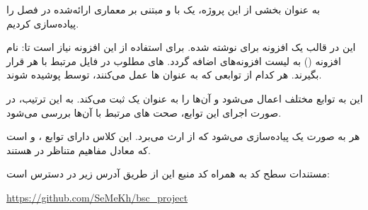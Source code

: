 به عنوان بخشی از این پروژه، یک   با  و مبتنی بر معماری ارائه‌شده در فصل  را پیاده‌سازی کردیم.


این  در قالب یک افزونه برای  نوشته شده. برای استفاده از این افزونه نیاز است تا:
 نام افزونه () به لیست افزونه‌های  اضافه گردد.
 ‌های مطلوب در فایل  مرتبط با هر   قرار بگیرند.
 هر کدام از توابعی که به عنوان  ‌ها عمل می‌کنند، توسط   پوشیده شوند.


این  به توابع مختلف اعمال می‌شود و آن‌ها را به عنوان یک   ثبت می‌کند. به این ترتیب، در صورت اجرای این توابع، صحت ‌های مرتبط با آن‌ها بررسی می‌شود.

هر  به صورت یک  پیاده‌سازی می‌شود که از  ارث می‌برد. این کلاس دارای توابع ،  و  است که معادل مفاهیم متناظر در  هستند.

مستندات سطح کد به همراه کد منبع این  از طریق آدرس زیر در دسترس است:

\begin{center}
\url{https://github.com/SeMeKh/bsc_project}
\end{center}
